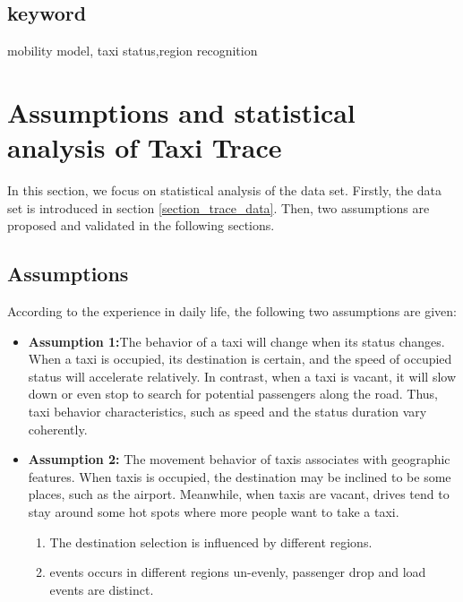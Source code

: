 \documentclass[camera-ready,twocolumn,10pt]{IEEEtran}
\begin{document}
\subsection*{keyword}
mobility model, taxi status,region recognition




\section{Assumptions and statistical analysis of Taxi Trace}
\label{section_assumptions_anlysis}

In this section, we focus on statistical analysis of the data set.
Firstly, the data set is introduced in section \ref{section_trace_data}. Then, two assumptions are proposed and validated in the following sections.



\subsection{Assumptions}
\label{section_statistic_analysis}
According to the experience in daily life, the following two assumptions are given:

\begin{itemize}
  \item \textbf{Assumption 1:}The behavior of a taxi will change when its status changes. When a taxi is occupied, its destination is certain, and the speed of occupied status will accelerate relatively. In contrast, when a taxi is vacant, it will slow down or even stop to search for potential passengers along the road. Thus, taxi behavior characteristics, such as speed and the status duration vary coherently.

  \item \textbf{Assumption 2:} The movement behavior of taxis associates with geographic features. When taxis is occupied, the destination may be inclined to be some places, such as the airport. Meanwhile, when taxis are vacant, drives tend to stay around some hot spots where more people want to take a taxi.
      \begin{enumerate}
        \item The destination selection is influenced by different regions.
        \item events occurs in different regions un-evenly, passenger drop and load events are distinct.
      \end{enumerate}
\end{itemize}
\end{document}
